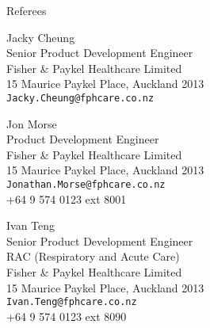 \documentclass[11pt]{tracv}
\begin{document}
\begin{columnsection}{Referees}

\begin{multicols}{2}

    	Jacky Cheung\\
	Senior Product Development Engineer\\ 
	Fisher \& Paykel Healthcare Limited\\
	15 Maurice Paykel Place, Auckland 2013\\ 
	\texttt{Jacky.Cheung@fphcare.co.nz}\\

	\vspace{0.25cm}

    	Jon Morse\\
	Product Development Engineer\\
	Fisher \& Paykel Healthcare Limited\\
	15 Maurice Paykel Place, Auckland 2013\\
	\texttt{Jonathan.Morse@fphcare.co.nz}\\
	+64 9 574 0123 ext 8001\\

	\vspace{0.25cm}
	\columnbreak

	Ivan Teng\\
	Senior Product Development Engineer\\
	RAC (Respiratory and Acute Care)\\
	Fisher \& Paykel Healthcare Limited\\
	15 Maurice Paykel Place, Auckland 2013\\
	\texttt{Ivan.Teng@fphcare.co.nz}\\
	+64 9 574 0123 ext 8090\\

\end{multicols}

\end{columnsection}
\end{document}
